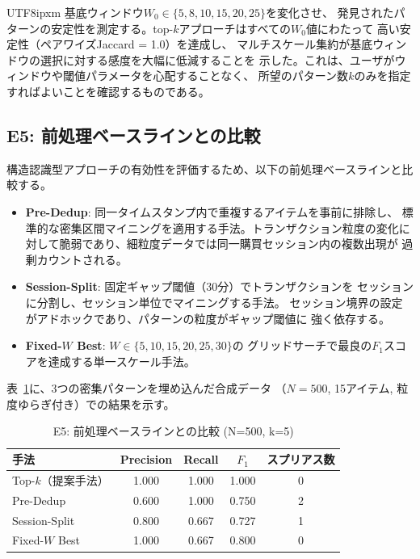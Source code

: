 \documentclass[conference]{IEEEtran}
\begin{document}
\begin{CJK}{UTF8}{ipxm}
基底ウィンドウ$W_0 \in \{5, 8, 10, 15, 20, 25\}$を変化させ、
発見されたパターンの安定性を測定する。top-$k$アプローチはすべての$W_0$値にわたって
高い安定性（ペアワイズJaccard = 1.0）を達成し、
マルチスケール集約が基底ウィンドウの選択に対する感度を大幅に低減することを
示した。これは、ユーザがウィンドウや閾値パラメータを心配することなく、
所望のパターン数$k$のみを指定すればよいことを確認するものである。

\subsection{E5: 前処理ベースラインとの比較}\label{sec:e5}

構造認識型アプローチの有効性を評価するため、以下の前処理ベースラインと比較する。

\begin{itemize}
\item \textbf{Pre-Dedup}: 同一タイムスタンプ内で重複するアイテムを事前に排除し、
  標準的な密集区間マイニングを適用する手法。トランザクション粒度の変化に
  対して脆弱であり、細粒度データでは同一購買セッション内の複数出現が
  過剰カウントされる。
\item \textbf{Session-Split}: 固定ギャップ閾値（30分）でトランザクションを
  セッションに分割し、セッション単位でマイニングする手法。
  セッション境界の設定がアドホックであり、パターンの粒度がギャップ閾値に
  強く依存する。
\item \textbf{Fixed-$W$ Best}: $W \in \{5, 10, 15, 20, 25, 30\}$の
  グリッドサーチで最良の$F_1$スコアを達成する単一スケール手法。
\end{itemize}

表~\ref{tab:e5}に、3つの密集パターンを埋め込んだ合成データ
（$N{=}500$, 15アイテム, 粒度ゆらぎ付き）での結果を示す。

\begin{table}[t]
\centering
\caption{E5: 前処理ベースラインとの比較 (N=500, k=5)}\label{tab:e5}
\begin{tabular}{lcccc}
\toprule
手法 & Precision & Recall & $F_1$ & スプリアス数 \\
\midrule
Top-$k$（提案手法） & 1.000 & 1.000 & 1.000 & 0 \\
Pre-Dedup & 0.600 & 1.000 & 0.750 & 2 \\
Session-Split & 0.800 & 0.667 & 0.727 & 1 \\
Fixed-$W$ Best & 1.000 & 0.667 & 0.800 & 0 \\
\bottomrule
\end{tabular}
\end{table}


\end{CJK}
\end{document}
